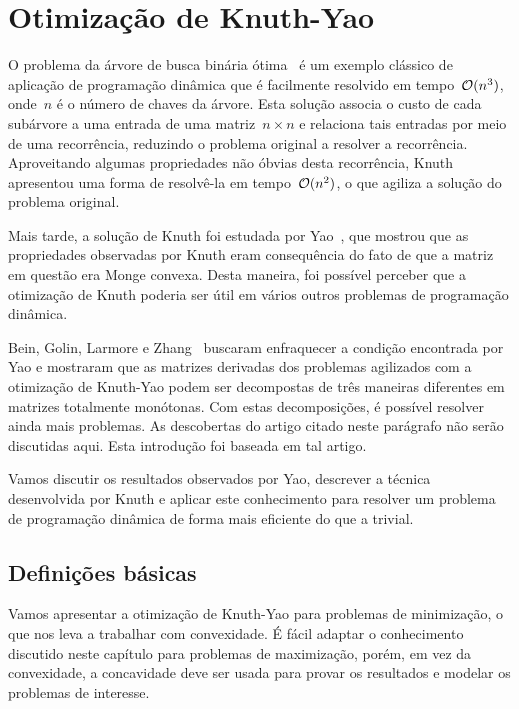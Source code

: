 \chapter{Otimização de Knuth-Yao}
\label{KY}


O problema da árvore de busca binária ótima~\cite{CLRS} é um exemplo clássico de aplicação de programação dinâmica que é facilmente resolvido em tempo~$\mathcal{O}(n^3)$, onde~$n$ é o número de chaves da árvore. Esta solução associa o custo de cada subárvore a uma entrada de uma matriz~${ n \times n }$ e relaciona tais entradas por meio de uma recorrência, reduzindo o problema original a resolver a recorrência. Aproveitando algumas propriedades não óbvias desta recorrência, Knuth~\cite{Knuth:1971} apresentou uma forma de resolvê-la em tempo~$\mathcal{O}(n^2)$, o que agiliza a solução do problema original.

Mais tarde, a solução de Knuth foi estudada por Yao~\cite{Yao:1980,Yao:1982}, que mostrou que as propriedades observadas por Knuth eram consequência do fato de que a matriz em questão era Monge convexa. Desta maneira, foi possível perceber que a otimização de Knuth poderia ser útil em vários outros problemas de programação dinâmica. 

Bein, Golin, Larmore e Zhang~\cite{Bein:2009} buscaram enfraquecer a condição encontrada por Yao e mostraram que as matrizes derivadas dos problemas agilizados com a otimização de Knuth-Yao podem ser decompostas de três maneiras diferentes em matrizes totalmente monótonas. Com estas decomposições, é possível resolver ainda mais problemas. As descobertas do artigo citado neste parágrafo não serão discutidas aqui. Esta introdução foi baseada em tal artigo.

Vamos discutir os resultados observados por Yao, descrever a técnica desenvolvida por Knuth e aplicar este conhecimento para resolver um problema de programação dinâmica de forma mais eficiente do que a trivial.


\section{Definições básicas} \label{KY:defs}

Vamos apresentar a otimização de Knuth-Yao para problemas de minimização, o que nos leva a trabalhar com convexidade. É fácil adaptar o conhecimento discutido neste capítulo para problemas de maximização, porém, em vez da convexidade, a concavidade deve ser usada para provar os resultados e modelar os problemas de interesse.

